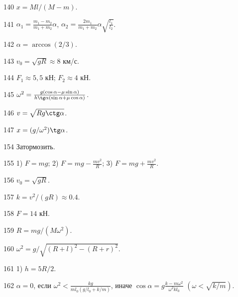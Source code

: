 \begin{Answer}{140}
$x = Ml/(M-m)$.
\end{Answer}
\begin{Answer}{141}
$\alpha_1 =\frac{m_1-m_2}{m_1+m_2}\alpha$, $\alpha_2 =\frac{2m_1}{m_1+m_2}\alpha \sqrt{\frac{l_1}{l_2}}$.
\end{Answer}
\begin{Answer}{142}
$\alpha = \arccos(2/3)$.
\end{Answer}
\begin{Answer}{143}
$v_0 = \sqrt{gR} \approx 8$ км/с.
\end{Answer}
\begin{Answer}{144}
$F_1 \approx 5,5$ кН; $F_2 \approx 4$ кН.
\end{Answer}
\begin{Answer}{145}
$\omega^2 = \frac{g(\cos \alpha - \mu \sin \alpha)}{h \tg \alpha (\sin \alpha + \mu \cos \alpha)}$.
\end{Answer}
\begin{Answer}{146}
$v = \sqrt{Rg \ctg \alpha}$.
\end{Answer}
\begin{Answer}{147}
$x = (g/\omega^2) \tg \alpha$.
\end{Answer}
\begin{Answer}{154}
Затормозить.
\end{Answer}
\begin{Answer}{155}
1) $F=mg$; 2) $F=mg-\frac{mv^2}{R}$; 3) $F=mg+\frac{mv^2}{R}$.
\end{Answer}
\begin{Answer}{156}
$v_0 = \sqrt{gR}$.
\end{Answer}
\begin{Answer}{157}
$k=v^2/(gR) \approx 0.4$.
\end{Answer}
\begin{Answer}{158}
$F = 14$ кН.
\end{Answer}
\begin{Answer}{159}
$R = mg/(M\omega^2)$.
\end{Answer}
\begin{Answer}{160}
$\omega^2 = g/\sqrt{(R+l)^2-(R+r)^2}$.
\end{Answer}
\begin{Answer}{161}
1) $h=5R/2$.
\end{Answer}
\begin{Answer}{162}
$\alpha = 0$, если $\omega^2 < \frac{kg}{ml_0(g/l_0 + k/m)}$, иначе $\cos \alpha = g\frac{k-m\omega^2}{\omega^2kl_0}$ $\left( \omega < \sqrt{k/m} \right)$.
\end{Answer}
